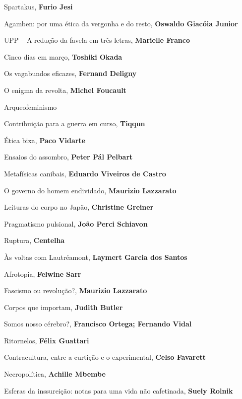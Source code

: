 \begin{multicols}{2}
\begin{enumerate}
{\item Spartakus, \textbf{Furio Jesi}
\item Agamben: por uma ética da vergonha e do resto, \textbf{Oswaldo Giacóia Junior}
\item UPP -- A redução da favela em três letras, \textbf{Marielle Franco}
\item Cinco dias em março, \textbf{Toshiki Okada}
\item Os vagabundos eficazes, \textbf{Fernand Deligny}
\item O enigma da revolta, \textbf{Michel Foucault}
\item Arqueofeminismo
\item Contribuição para a guerra em curso, \textbf{Tiqqun}
\item Ética bixa, \textbf{Paco Vidarte}
\item Ensaios do assombro, \textbf{Peter Pál Pelbart}
\item Metafísicas canibais, \textbf{Eduardo Viveiros de Castro}
\item O governo do homem endividado, \textbf{Maurizio Lazzarato}
\item Leituras do corpo no Japão, \textbf{Christine Greiner}
\item Pragmatismo pulsional, \textbf{João Perci Schiavon}
\item Ruptura, \textbf{Centelha}
\item Às voltas com Lautréamont, \textbf{Laymert Garcia dos Santos}
\item Afrotopia, \textbf{Felwine Sarr}
\item Fascismo ou revolução?, \textbf{Maurizio Lazzarato}
\item Corpos que importam, \textbf{Judith Butler}
\item Somos nosso cérebro?, \textbf{Francisco Ortega; Fernando Vidal}
\item Ritornelos, \textbf{Félix Guattari}
\item Contracultura, entre a curtição e o experimental, \textbf{Celso Favarett}
\item Necropolítica, \textbf{Achille Mbembe}
\item Esferas da inssureição: notas para uma vida não cafetinada, \textbf{Suely Rolnik}

}
\end{enumerate}
\end{multicols}

\pagebreak